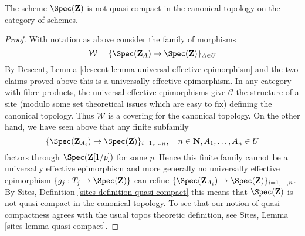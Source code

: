 \begin{lemma}
\label{lemma-Z-not-quasi-compact}
The scheme $\Spec(\mathbf{Z})$ is not quasi-compact
in the canonical topology on the category of schemes.
\end{lemma}

\begin{proof}
With notation as above consider the family of morphisms
$$
\mathcal{W} = \{\Spec(\mathbf{Z}_A) \to \Spec(\mathbf{Z})\}_{A \in U}
$$
By Descent, Lemma \ref{descent-lemma-universal-effective-epimorphism}
and the two claims proved above
this is a universally effective epimorphism.
In any category with fibre products, the universal effective epimorphisms
give $\mathcal{C}$ the structure of a site (modulo some set theoretical
issues which are easy to fix) defining the canonical topology.
Thus $\mathcal{W}$ is a covering for the canonical topology.
On the other hand, we have seen above that any finite subfamily
$$
\{\Spec(\mathbf{Z}_{A_i}) \to \Spec(\mathbf{Z})\}_{i = 1, \ldots, n},\quad
n \in \mathbf{N}, A_1, \ldots, A_n \in U
$$
factors through $\Spec(\mathbf{Z}[1/p])$ for some $p$.
Hence this finite family cannot be a universally effective epimorphism
and more generally no universally effective epimorphism
$\{g_j : T_j \to \Spec(\mathbf{Z})\}$ can refine
$\{\Spec(\mathbf{Z}_{A_i}) \to \Spec(\mathbf{Z})\}_{i = 1, \ldots, n}$.
By Sites, Definition \ref{sites-definition-quasi-compact}
this means that $\Spec(\mathbf{Z})$ is not quasi-compact
in the canonical topology. To see that our notion of quasi-compactness
agrees with the usual topos theoretic definition, see
Sites, Lemma \ref{sites-lemma-quasi-compact}.
\end{proof}













